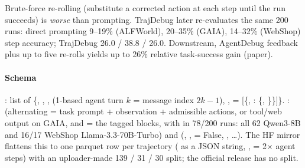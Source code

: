 \begin{center}\footnotesize\setlength{\tabcolsep}{2.5pt}
\end{center}
Brute-force re-rolling (substitute a corrected action at each step until the run succeeds) is \emph{worse} than prompting. TrajDebug later re-evaluates the same 200 runs: direct prompting 9--19\% (ALFWorld), 20--35\% (GAIA), 14--32\% (WebShop) step accuracy; TrajDebug 26.0 / 38.8 / 26.0. Downstream, AgentDebug feedback plus up to five re-rolls yields up to 26\% relative task-success gain (paper).

\paragraph{Schema} : list of \{, , ,  (1-based agent turn $k$ = message index $2k{-}1$), ,  = [\{, : \{, \}\}]\}. :  (alternating  = task prompt + observation + admissible actions, or tool/web output on GAIA, and  = the tagged blocks, with  in 78/200 runs: all 62 Qwen3-8B and 16/17 WebShop Llama-3.3-70B-Turbo) and  (, ,  = False, , \dots). The HF mirror flattens this to one parquet row per trajectory ( as a JSON string, ,  = 2$\times$ agent steps) with an uploader-made 139 / 31 / 30 split; the official release has no split.

